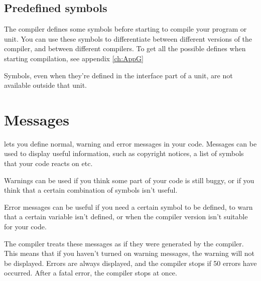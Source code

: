 \subsection{Predefined symbols}

The \fpc compiler defines some symbols before starting to compile your
program or unit. You can use these symbols to differentiate between
different versions of the compiler, and between different compilers.
To get all the possible defines when starting compilation,
see appendix \ref{ch:AppG}

\begin{remark}Symbols, even when they're defined in the interface part of
a unit, are not available outside that unit.
\end{remark}


\section{Messages}
\label{se:Messages}
\fpc lets you define normal, warning and error messages in your code.
Messages can be used to display useful information, such as copyright
notices, a list of symbols that your code reacts on etc.

Warnings can be used if you think some part of your code is still buggy, or
if you think that a certain combination of symbols isn't useful.

Error messages can be useful if you need a certain symbol to be defined,
to warn that a certain variable isn't defined, or when the compiler
version isn't suitable for your code.

The compiler treats these messages as if they were generated by the
compiler. This means that if you haven't turned on warning messages, the
warning will not be displayed. Errors are always displayed, and the
compiler stops if 50 errors have occurred. After a fatal error, the compiler
stops at once.

